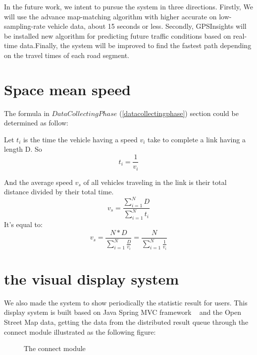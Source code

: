 \documentclass{acm_proc_article-sp}
\begin{document}
In the future work, we intent to pursue the system in three directions. Firstly, We will use the advance map-matching algorithm with higher accurate on low-sampling-rate vehicle data, about 15 seconds or less. Secondly, GPSInsights will be installed new algorithm for predicting future traffic conditions based on real-time data.Finally, the system will be improved to find the fastest path depending on the travel times of each road segment.
%

%
%
\appendix \label{appendix}

\section{Space mean speed}
The formula in $Data Collecting Phase$ (\ref{datacollectingphase}) section could be determined as follow:

Let $t_{i}$ is the time the vehicle having a speed $v_{i}$ take to complete a link having a length D. So
	\[ t_{i} = \frac{1}{v_{i}} \] 

And the average speed $v_{s}$ of all vehicles traveling in the link is their total distance divided by their total time.
	\[v_{s} = \frac{\sum_{i=1}^{N} D}{\sum_{i=1}^{N} t_{i}}\]
It's equal to:
	\[v_{s} = \frac{N \ast D}{\sum_{i=1}^{N} \frac{D}{v_{i}}} = \frac{N}{\sum_{i=1}^{N}\frac{1}{v_{i}}} \]

\section{the visual display system}

We also made the system to show periodically the statistic result for users. This display system is built based on Java Spring MVC framework ~\cite{javaspringmvc} and the Open Street Map data, getting the data from the distributed result queue through the connect module illustrated as the following figure:

\begin{figure}[h]
	\centering
	\caption{The connect module}
	\label{fig:connectmodule}
\end{figure}
\end{document}
